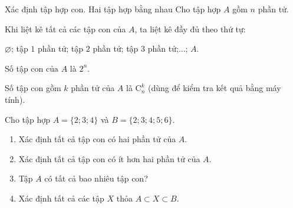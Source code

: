 \begin{dang}{Xác định tập hợp con. Hai tập hợp bằng nhau}
	Cho tập hợp $A$ gồm $n$ phần tử.
	\begin{listEX}[1]
		\item [\ding{172}] Khi liệt kê tất cả các tập con của $A$, ta liệt kê đầy đủ theo thứ tự:\\		
		\centerline{ $\varnothing$; tập $1$ phần tử; tập $2$ phần tử; tập $3$ phần tử;...; $A$.}
		\item [\ding{173}] Số tập con của $A$ là $2^n$.
		\item [\ding{174}] Số tập con gồm $k$ phần tử của $A$ là $\mathrm{C}_n^k$ (dùng để kiểm tra kết quả bằng máy tính).
	\end{listEX}
\end{dang}
\begin{vd}
	Cho tập hợp $A = \{2; 3; 4\}$ và $B = \{2; 3; 4; 5; 6\}$.
	\begin{enumerate}
		\item[a)] Xác định tất cả tập con có hai phần tử của $A$.
		\item[b)] Xác định tất cả tập con có ít hơn hai phần tử của $A$.
		\item[c)] Tập $A$ có tất cả bao nhiêu tập con?
		\item[d)] Xác định tất cả các tập $X$ thỏa $A \subset X \subset B$.
	\end{enumerate}
\end{vd}


